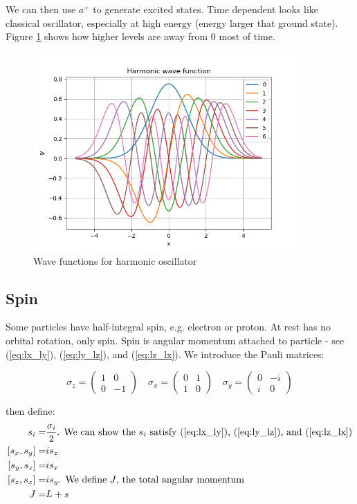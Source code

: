 \documentclass[]{article}
\begin{document}
We can then use $a^+$  to generate excited states. Time dependent looks like classical oscillator, especially at high energy (energy larger that ground state). Figure \ref{fig:wave:harmonic} shows how higher levels are away from 0 most of time.

\begin{figure}[H]
	\caption{Wave functions for harmonic oscillator}\label{fig:wave:harmonic}
	\includegraphics[width=0.9\textwidth]{harmonic_wavefunction}
\end{figure}

\subsection{Spin}

Some particles have half-integral spin, e.g. electron or proton. At rest has no orbital rotation, only spin. Spin is angular momentum attached to particle - see (\ref{eq:lx_ly}), (\ref{eq:ly_lz}), and (\ref{eq:lz_lx}). We introduce the Pauli matrices:

$$
\sigma_z = \begin{pmatrix}
1 & 0 \\
0 & -1
\end{pmatrix}
\quad
\sigma_x = \begin{pmatrix}
0 & 1 \\
1 & 0
\end{pmatrix}
\quad
\sigma_y = \begin{pmatrix}
0 & -i \\
i & 0
\end{pmatrix}
$$

then define:
\begin{align*}
s_i =& \frac{\sigma_i}{2} \text{. We can show the $s_i$ satisfy (\ref{eq:lx_ly}), (\ref{eq:ly_lz}), and (\ref{eq:lz_lx})}\\
[s_x,s_y] =& i s_z \\
[s_y,s_z] =& i s_x\\
[s_z,s_x] =& i s_y \text{. We define $J$, the total angular momentum}\\
J=&L+s
\end{align*}
\end{document}
